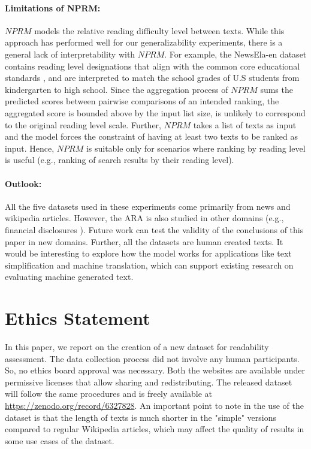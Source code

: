 \documentclass[11pt]{article}
\begin{document}
\paragraph{Limitations of NPRM: } $NPRM$ models the relative reading difficulty level between texts.  While this approach has performed well for our generalizability experiments, there is a general lack of interpretability with $NPRM$. For example, the NewsEla-en dataset contains reading level designations that align with the common core educational standards \cite{Porter.McMaken.ea-11}, and are interpreted to match the school grades of U.S students from kindergarten to high school. Since the aggregation process of $NPRM$ sums the predicted scores between pairwise comparisons of an intended ranking, the aggregated score is bounded above by the input list size, is unlikely to correspond to the original reading level scale. Further, $NPRM$ takes a list of texts as input and the model forces the constraint of having at least two texts to be ranked as input. Hence, $NPRM$ is suitable only for scenarios where ranking by reading level is useful (e.g., ranking of search results by their reading level).

\paragraph{Outlook: }All the five datasets used in these experiments come primarily from news and wikipedia articles. However, the ARA is also studied in other domains (e.g., financial disclosures \cite{Loughran.McDonald-14}). Future work can test the validity of the conclusions of this paper in new domains. Further, all the datasets are human created texts. It would be interesting to explore how the model works for applications like text simplification and machine translation, which can support existing research on evaluating machine generated text. 

\section*{Ethics Statement}
In this paper, we report on the creation of a new dataset for readability assessment. The data collection process did not involve any human participants. So, no ethics board approval was necessary. Both the websites are available under permissive licenses that allow sharing and redistributing. The released dataset will follow the same procedures and is freely available at \url{https://zenodo.org/record/6327828}. An important point to note in the use of the dataset is that the length of texts is much shorter in the "simple" versions compared to regular Wikipedia articles, which may affect the quality of results in some use cases of the dataset. 
\end{document}
